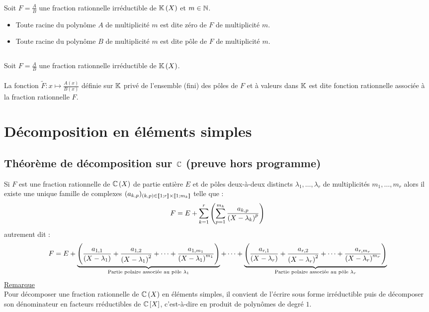 \subsection{}
\begin{defprop}
    ~\\
    Soit \(F = \frac{A}{B}\) une fraction rationnelle irréductible de \(\mathbb{K}\left(X\right)\) et \(m \in \mathbb{N}\).
    \begin{itemize}
        \item Toute racine du polynôme \(A\) de multiplicité \(m\) est dite zéro de \(F\) de multiplicité \(m\).
        \item Toute racine du polynôme \(B\) de multiplicité \(m\) est dite pôle de \(F\) de multiplicité \(m\).
    \end{itemize}
\end{defprop}
\subsection{}
\begin{defprop}
    Soit \(F = \frac{A}{B}\) une fraction rationnelle irréductible de \(\mathbb{K}\left(X\right)\).\\~\\
    La fonction \(\tilde{F} : x \mapsto \frac{A(x)}{B(x)}\) définie sur \(\mathbb{K}\) privé de l’ensemble (fini) des pôles de \(F\) et à valeurs dans \(\mathbb{K}\) est dite fonction rationnelle associée à la fraction rationnelle \(F\).
\end{defprop}
\section{Décomposition en éléments simples}
\subsection{Théorème de décomposition sur \(\mathbb{C}\) (preuve hors programme)}
\begin{defprop}
    Si \(F\) est une fraction rationnelle de \(\mathbb{C}\left(X\right)\) de partie entière \(E\) et de pôles deux-à-deux distincts \(\lambda_1, \dots , \lambda_r\) de multiplicités \(m_1, \dots , m_r\) alors il existe une unique famille de complexes \((a_{k,p})_{(k,p)\in \left\llbracket1;r\right\rrbracket\times \left\llbracket1;m_k\right\rrbracket}\) telle que :
\[F = E + \sum^r_{k=1}\left(\sum^{m_k}_{p=1} \frac{a_{k,p}}{\left(X - \lambda_k\right)^p}\right)\]
autrement dit :
\[F = E + \underbrace{\left(\frac{a_{1,1}}{\left(X - \lambda_1\right)} + \frac{a_{1,2}}{\left(X - \lambda_1\right)^2} + \dots + \frac{a_{1,m_1}}{\left(X - \lambda_1\right)^{m_1}}\right)}_{\text{Partie polaire associée au pôle } \lambda_1} + \dots + \underbrace{\left(\frac{a_{r,1}}{\left(X - \lambda_r\right)} + \frac{a_{r,2}}{\left(X - \lambda_r\right)^2} + \dots + \frac{a_{r,m_r}}{\left(X - \lambda_r\right)^{m_r}}\right)}_{\text{Partie polaire associée au pôle } \lambda_r}\]
    \underline{Remarque}\\
Pour décomposer une fraction rationnelle de \(\mathbb{C}\left(X\right)\) en éléments simples, il convient de l’écrire sous forme irréductible puis de décomposer son dénominateur en facteurs rréductibles de \(\mathbb{C} \left[X\right]\), c’est-à-dire en produit de polynômes de degré \(1\).
\end{defprop}

